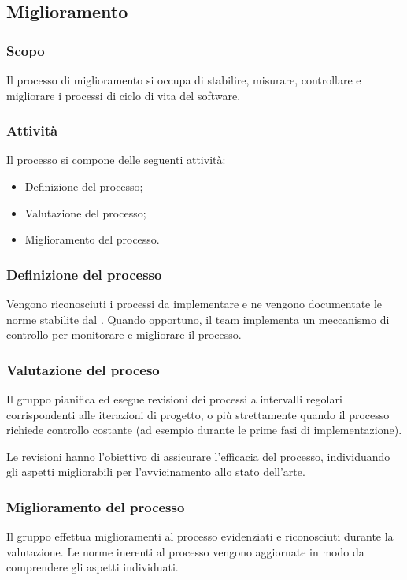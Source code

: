 \subsection{Miglioramento}
\subsubsection{Scopo}
\par Il processo di miglioramento si occupa di stabilire, misurare, controllare e migliorare i processi di ciclo di vita del software.

\subsubsection{Attività}
\par Il processo si compone delle seguenti attività:
\begin{itemize}
  \item Definizione del processo;
  \item Valutazione del processo;
  \item Miglioramento del processo.
\end{itemize}

\subsubsection{Definizione del processo}
\par Vengono riconosciuti i processi da implementare e ne vengono documentate le norme stabilite dal \WoW. Quando opportuno, il team implementa un meccanismo di controllo per monitorare e migliorare il processo.

\subsubsection{Valutazione del proceso}
\par Il gruppo pianifica ed esegue revisioni dei processi a intervalli regolari corrispondenti alle iterazioni di progetto, o più strettamente quando il processo richiede controllo costante (ad esempio durante le prime fasi di implementazione).

\par Le revisioni hanno l'obiettivo di assicurare l'efficacia del processo, individuando gli aspetti migliorabili per l'avvicinamento allo stato dell'arte.

\subsubsection{Miglioramento del processo}
\par Il gruppo effettua miglioramenti al processo evidenziati e riconosciuti durante la valutazione. Le norme inerenti al processo vengono aggiornate in modo da comprendere gli aspetti individuati.

